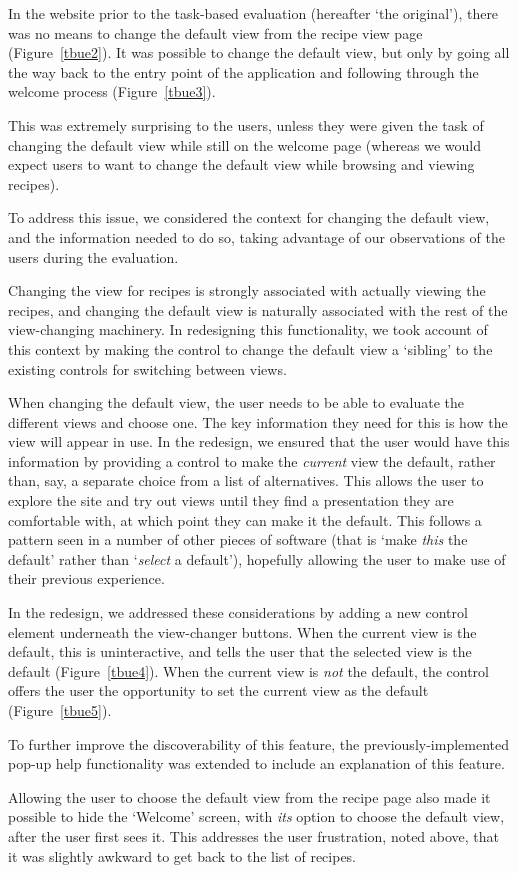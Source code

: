 In the website prior to the task-based evaluation (hereafter `the
original'), there was no means to change the default view from the
recipe view page (Figure~\ref{tbue2}). It was possible to change the
default view, but only by going all the way back to the entry point of
the application and following through the welcome
process (Figure~\ref{tbue3}).

This was extremely surprising to the users, unless they were given the
task of changing the default view while still on the welcome page
(whereas we would expect users to want to change the default view
while browsing and viewing recipes).

To address this issue, we considered the context for changing the
default view, and the information needed to do so, taking advantage of
our observations of the users during the evaluation.

Changing the view for recipes is strongly associated with actually
viewing the recipes, and changing the default view is naturally
associated with the rest of the view-changing machinery. In
redesigning this functionality, we took account of this context by
making the control to change the default view a `sibling' to the
existing controls for switching between views.

When changing the default view, the user needs to be able to evaluate
the different views and choose one. The key information they need for
this is how the view will appear in use. In the redesign, we ensured
that the user would have this information by providing a control to
make the \emph{current} view the default, rather than, say, a separate
choice from a list of alternatives. This allows the user to explore
the site and try out views until they find a presentation they are
comfortable with, at which point they can make it the default. This
follows a pattern seen in a number of other pieces of software (that
is `make \emph{this} the default' rather than `\emph{select} a
default'), hopefully allowing the user to make use of their previous
experience.

In the redesign, we addressed these considerations by adding a new
control element underneath the view-changer buttons. When the current
view is the default, this is uninteractive, and tells the user that
the selected view is the default (Figure~\ref{tbue4}). When the current
view is \emph{not} the default, the control offers the user the
opportunity to set the current view as the default (Figure~\ref{tbue5}).

To further improve the discoverability of this feature, the
previously-implemented pop-up help functionality was extended to
include an explanation of this feature.

Allowing the user to choose the default view from the recipe page also
made it possible to hide the `Welcome' screen, with \emph{its} option
to choose the default view, after the user first sees it. This
addresses the user frustration, noted above, that it was slightly
awkward to get back to the list of recipes.
